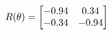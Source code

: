 \documentclass[preview]{standalone}
\begin{document}
\begin{align*}
\special{dvisvgm:raw <g id='unique000'>}R(\theta) = \begin{bmatrix}-0.94 & 0.34\\-0.34 & -0.94\end{bmatrix}\special{dvisvgm:raw </g>}
\end{align*}
\end{document}

